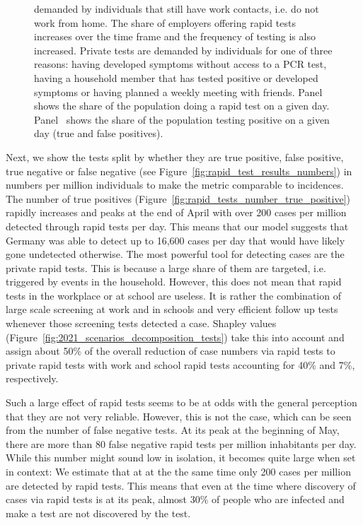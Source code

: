 \begin{figure}[ht]
{        demanded by individuals that still have work contacts, i.e. do not work from
        home. The share of employers offering rapid tests increases over the time frame
        and the frequency of testing is also increased. Private tests are demanded by
        individuals for one of three reasons: having developed symptoms without access
        to a PCR test, having a household member that has tested positive or developed
        symptoms or having planned a weekly meeting with friends.
        Panel~ shows the share of the
        population doing a rapid test on a given day.
        Panel~ shows the share of the population
        testing positive on a given day (true and false positives).}
\end{figure}

\FloatBarrier

Next, we show the tests split by whether they are true positive, false positive, true
negative or false negative (see Figure~\ref{fig:rapid_test_results_numbers}) in numbers
per million individuals to make the metric comparable to incidences.
The number of true positives (Figure~\ref{fig:rapid_tests_number_true_positive}) rapidly
increases and peaks at the end of April with over 200 cases per million detected through
rapid tests per day. This means that our model suggests that Germany was able to detect
up to 16,600 cases per day that would have likely gone undetected otherwise. The most
powerful tool for detecting cases are the private rapid tests. This is because a large
share of them are targeted, i.e. triggered by events in the household. However, this
does not mean that rapid tests in the workplace or at school are useless. It is rather
the combination of large scale screening at work and in schools and very efficient
follow up tests whenever those screening tests detected a case. Shapley values
(Figure~\ref{fig:2021_scenarios_decomposition_tests}) take this into account and
assign about 50\% of the overall reduction of case numbers via rapid tests to private
rapid tests with work and school rapid tests accounting for 40\% and 7\%,
respectively.

Such a large effect of rapid tests seems to be at odds with the general perception that
they are not very reliable. However, this is not the case, which can be seen
from the number of false negative tests. At its peak at the beginning of May, there are
more than 80 false negative rapid tests per million inhabitants per day. While this
number might sound low in isolation, it becomes quite large when set in context: We
estimate that at at the the same time only 200 cases per million are detected by rapid
tests. This means that even at the time where discovery of cases via rapid tests is at
its peak, almost 30\% of people who are infected and make a test are not discovered by
the test.

